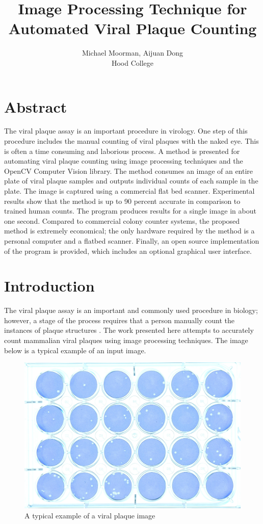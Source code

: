 \documentclass[11pt,final,twocolumn]{IEEEtran}
\begin{document}
\title{Image Processing Technique for Automated Viral Plaque Counting}
\author{Michael Moorman, Aijuan Dong \\
Hood College}
\maketitle
\section{Abstract}
The viral plaque assay is an important procedure in virology. One step of this procedure includes the manual counting of viral plaques with the naked eye.  This is often a time consuming and laborious process. A method is presented for automating viral plaque counting using image processing techniques and the OpenCV Computer Vision library. The method consumes an image of an entire plate of viral plaque samples and outputs individual counts of each sample in the plate. The image is captured using a commercial flat bed scanner. Experimental results show that the method is up to 90 percent accurate in comparison to trained human counts. The program produces results for a single image in about one second.  Compared to commercial colony counter systems, the proposed method is extremely economical; the only hardware required by the method is a personal computer and a flatbed scanner.  Finally, an open source implementation of the program is provided, which includes an optional graphical user interface. 



\section{Introduction}
The viral plaque assay is an important and commonly used procedure in biology; however, a stage of the process requires that a person manually count the instances of plaque structures . The work presented here attempts to accurately count mammalian  viral plaques using image processing techniques. The image below is a typical example of an input image.
\begin{figure}[h]
\centering
\includegraphics[width=.4\textwidth]{sample.jpg}
\caption{A typical example of a viral plaque image}
\label{fig:sample}
\end{figure}
\end{document}
